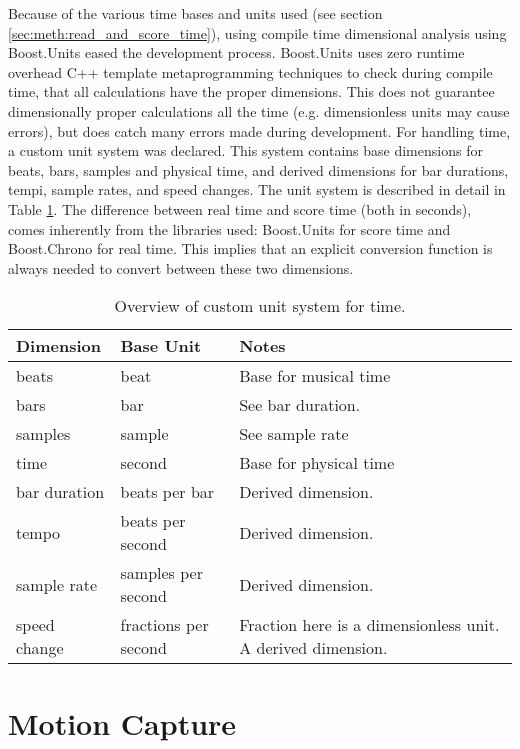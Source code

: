 Because of the various time bases and units used
(see section \ref{sec:meth:read_and_score_time}),
using compile time dimensional analysis using Boost.Units \cite{needed?}
eased the development process.
Boost.Units uses zero runtime overhead C++ template metaprogramming \cite{abrahams?}
techniques to check during compile time,
that all calculations have the proper dimensions.
This does not guarantee dimensionally proper calculations all the time
(e.g. dimensionless units may cause errors),
but does catch many errors made during development.
For handling time,
a custom unit system was declared.
This system contains base dimensions for
beats, bars, samples and physical time,
and derived dimensions for
bar durations, tempi, sample rates, and speed changes.
The unit system is described in detail in Table \ref{tab:score_units}.
The difference between real time and score time (both in seconds),
comes inherently from the libraries used:
Boost.Units for score time and Boost.Chrono for real time.
This implies that an explicit conversion function is always
needed to convert between these two dimensions.

\begin{table}
\begin{center}
\begin{tabular}{ | l  l  p{5.5cm} |}
\hline
Dimension & Base Unit & Notes \\ \hline
beats & beat & Base for musical time \\
bars & bar & See bar duration. \\
samples & sample & See sample rate\\
time & second & Base for physical time \\
bar duration & beats per bar & Derived dimension. \\
tempo & beats per second & Derived dimension. \\
sample rate & samples per second & Derived dimension. \\
speed change & fractions per second & Fraction here is a dimensionless unit. A derived dimension. \\
\hline
\end{tabular}
\caption{Overview of custom unit system for time.}
\label{tab:score_units}
\end{center}
\end{table}

\section{Motion Capture}

